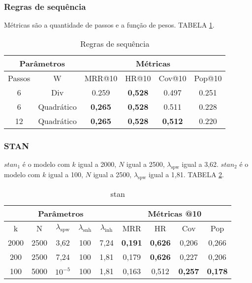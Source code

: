   \subsubsection{Regras de sequência}
Métricas são a quantidade de passos e a função de pesos. TABELA \ref{app:sr_a1}.
\begin{table}[htbp]
    \centering
    \begin{tabular}{|c|c|c|c|c|c|}
        \hline
        \multicolumn{2}{|c|}{Parâmetros} & \multicolumn{4}{c|}{Métricas} \\
        \hline
        Passos & W & MRR@10 & HR@10 & Cov@10 & Pop@10 \\
        \hline
        6 & Div & 0.259 & \textbf{0,528} & 0.497 & 0.251 \\
        \hline
        6 & Quadrático & \textbf{0,265} & \textbf{0,528} & 0.511 & 0.228 \\
        \hline
        12 & Quadrático & \textbf{0,265} & \textbf{0,528} & \textbf{0,512} & 0.220 \\
        \hline
        \end{tabular}
    \caption{Regras de sequência}
    \label{app:sr_a1}
\end{table}


\subsubsection{STAN}
$stan_1$ é o modelo com $k$ igual a 2000, $N$ igual a 2500,
$\lambda_{\text{spw}}$ igual a 3,62. $stan_2$ é o modelo com $k$ igual a 100,
$N$ igual a 2500, $\lambda_{\text{spw}}$ igual a 1,81. TABELA \ref{app:stan_a1}.


\begin{table}[htbp]
    \centering
    \begin{tabular}{|c|c|c|c|c|c|c|c|c|}
      \hline
      \multicolumn{5}{|c|}{Parâmetros} & \multicolumn{4}{c|}{Métricas @10} \\
      \hline
      k & N & $\lambda_{\text{spw}}$ & $\lambda_{\text{snh}}$ & $\lambda_{\text{inh}}$ & MRR & HR & Cov & Pop \\
      \hline
      2000 & 2500 & 3,62 & 100 & 7,24 & \textbf{0,191} & \textbf{0,626} & 0,206 & 0,266 \\
      \hline
      200 & 2500 & 7,24 & 100 & 1,81& 0,179 & \textbf{0,626} & 0,227 & 0,206 \\
      \hline
      100 & 5000 & $10^{-5}$ & 100 & 1,81 & 0,163 & 0,512 & \textbf{0,257} & \textbf{0,178} \\
      \hline

    \end{tabular}
    \caption{stan}
    \label{app:stan_a1}
  \end{table}


